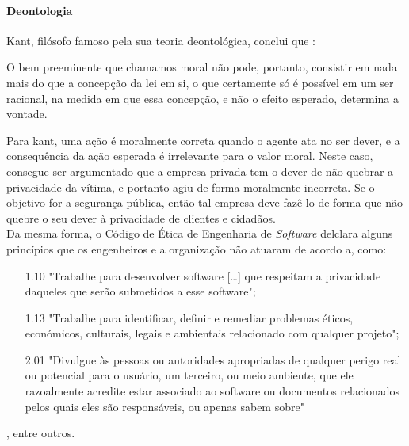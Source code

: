 \documentclass[12pt]{../diazessay}
\begin{document}
\paragraph{Deontologia}
Kant, filósofo famoso pela sua teoria deontológica, conclui que \citeyear{kant}: 
\begin{displayquote} 
  O bem preeminente que chamamos moral não pode, portanto, consistir em nada mais do que a concepção da lei em si, o que certamente só é possível em um ser racional, na medida em que essa concepção, e não o efeito esperado, determina a vontade.
\end{displayquote}
Para kant, uma ação é moralmente correta quando o agente ata no ser dever, e a consequência da ação esperada é irrelevante para o valor moral. Neste caso, consegue ser argumentado que a empresa privada tem o dever de não quebrar a privacidade da vítima, e portanto agiu de forma moralmente incorreta. Se o objetivo for a segurança pública, então tal empresa deve fazê-lo de forma que não quebre o seu dever à privacidade de clientes e cidadãos. \\
Da mesma forma, o Código de Ética de Engenharia de \textit{Software} \parencite{code} delclara alguns princípios que os engenheiros e a organização não atuaram de acordo a, como:
\begin{itemize}
  \item [1.10] "Trabalhe para desenvolver software [\dots] que respeitam a privacidade daqueles que serão submetidos a esse software";
  \item [1.13] "Trabalhe para identificar, definir e remediar problemas éticos, económicos, culturais, legais e ambientais relacionado com qualquer projeto";
  \item [2.01] "Divulgue às pessoas ou autoridades apropriadas de qualquer perigo real ou potencial para o usuário, um terceiro, ou meio ambiente, que ele razoalmente acredite estar associado ao software ou documentos relacionados pelos quais eles são responsáveis, ou apenas sabem sobre"
\end{itemize}
, entre outros. \\
\end{document}
